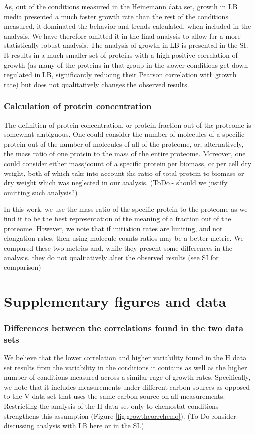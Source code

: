 \documentclass[notitlepage]{article}
\begin{document}
As, out of the conditions measured in the Heinemann data set, growth in LB media presented a much faster growth rate than the rest of the conditions measured, it dominated the behavior and trends calculated, when included in the analysis.
We have therefore omitted it in the final analysis to allow for a more statistically robust analysis.
The analysis of growth in LB is presented in the SI.
It results in a much smaller set of proteins with a high positive correlation of growth (as many of the proteins in that group in the slower conditions get down-regulated in LB, significantly reducing their Pearson correlation with growth rate) but does not qualitatively changes the observed results.

\subsubsection{Calculation of protein concentration}
\label{protconc}
The definition of protein concentration, or protein fraction out of the proteome is somewhat ambiguous.
One could consider the number of molecules of a specific protein out of the number of molecules of all of the proteome, or, alternatively, the mass ratio of one protein to the mass of the entire proteome.
Moreover, one could consider either mass/count of a specific protein per biomass, or per cell dry weight, both of which take into account the ratio of total protein to biomass or dry weight which was neglected in our analysis.
(ToDo - should we justify omitting such analysis?)

In this work, we use the mass ratio of the specific protein to the proteome as we find it to be the best representation of the meaning of a fraction out of the proteome.
However, we note that if initiation rates are limiting, and not elongation rates, then using molecule counts ratios may be a better metric.
We compared these two metrics and, while they present some differences in the analysis, they do not qualitatively alter the observed results (see SI for comparison).

\section{Supplementary figures and data}
\subsubsection{Differences between the correlations found in the two data sets}
\label{heinemannchemo}
We believe that the lower correlation and higher variability found in the H data set results from the variability in the conditions it contains as well as the higher number of conditions measured across a similar rage of growth rates.
Specifically, we note that it includes measurements under different carbon sources as opposed to the V data set that uses the same carbon source on all measurements.
Restricting the analysis of the H data set only to chemostat conditions strengthens this assumption (Figure \ref{fig:growthcorrchemo}).
(To-Do consider discussing analysis with LB here or in the SI.)
\end{document}
